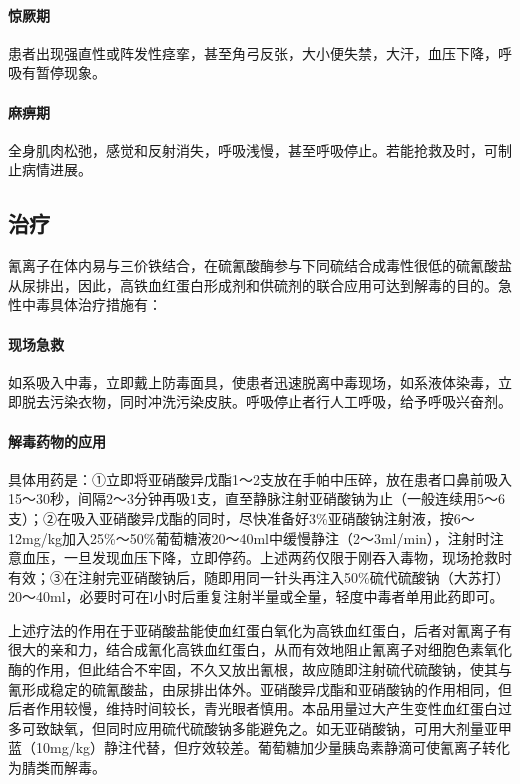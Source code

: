 \paragraph{惊厥期}

患者出现强直性或阵发性痉挛，甚至角弓反张，大小便失禁，大汗，血压下降，呼吸有暂停现象。

\paragraph{麻痹期}

全身肌肉松弛，感觉和反射消失，呼吸浅慢，甚至呼吸停止。若能抢救及时，可制止病情进展。

\subsection{治疗}

氰离子在体内易与三价铁结合，在硫氰酸酶参与下同硫结合成毒性很低的硫氰酸盐从尿排出，因此，高铁血红蛋白形成剂和供硫剂的联合应用可达到解毒的目的。急性中毒具体治疗措施有：

\paragraph{现场急救}

如系吸入中毒，立即戴上防毒面具，使患者迅速脱离中毒现场，如系液体染毒，立即脱去污染衣物，同时冲洗污染皮肤。呼吸停止者行人工呼吸，给予呼吸兴奋剂。

\paragraph{解毒药物的应用}

具体用药是：①立即将亚硝酸异戊酯1～2支放在手帕中压碎，放在患者口鼻前吸入15～30秒，间隔2～3分钟再吸1支，直至静脉注射亚硝酸钠为止（一般连续用5～6支）；②在吸入亚硝酸异戊酯的同时，尽快准备好3\%亚硝酸钠注射液，按6～12mg/kg加入25\%～50\%葡萄糖液20～40ml中缓慢静注（2～3ml/min），注射时注意血压，一旦发现血压下降，立即停药。上述两药仅限于刚吞入毒物，现场抢救时有效；③在注射完亚硝酸钠后，随即用同一针头再注入50\%硫代硫酸钠（大苏打）20～40ml，必要时可在l小时后重复注射半量或全量，轻度中毒者单用此药即可。

上述疗法的作用在于亚硝酸盐能使血红蛋白氧化为高铁血红蛋白，后者对氰离子有很大的亲和力，结合成氰化高铁血红蛋白，从而有效地阻止氰离子对细胞色素氧化酶的作用，但此结合不牢固，不久又放出氰根，故应随即注射硫代硫酸钠，使其与氰形成稳定的硫氰酸盐，由尿排出体外。亚硝酸异戊酯和亚硝酸钠的作用相同，但后者作用较慢，维持时间较长，青光眼者慎用。本品用量过大产生变性血红蛋白过多可致缺氧，但同时应用硫代硫酸钠多能避免之。如无亚硝酸钠，可用大剂量亚甲蓝（10mg/kg）静注代替，但疗效较差。葡萄糖加少量胰岛素静滴可使氰离子转化为腈类而解毒。

